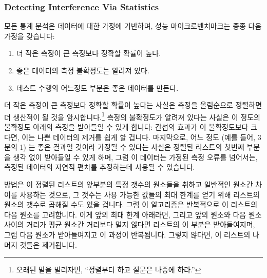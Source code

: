 \fi

\subsubsection{Detecting Interference Via Statistics}
\label{sec:debugging:Detecting Interference Via Statistics}

모든 통계 분석은 데이터에 대한 가정에 기반하며, 성능 마이크로벤치마크는 종종
다음 가정을 갖습니다:

\begin{enumerate}
\item	더 작은 측정이 큰 측정보다 정확할 확률이 높다.
\item	좋은 데이터의 측정 불확정도는 알려져 있다.
\item	테스트 수행의 어느정도 부분은 좋은 데이터를 만든다.

\end{enumerate}

더 작은 측정이 큰 측정보다 정확할 확률이 높다는 사실은 측정을 올림순으로
정렬하면 더 생산적이 될 것을 암시합니다.\footnote{
	오래된 말을 빌리자면, ``정렬부터 하고 질문은 나중에 하라.''}
측정의 불확정도가 알려져 있다는 사실은 이 정도의 불확정도 아래의 측정을
받아들일 수 있게 합니다:  간섭의 효과가 이 불확정도보다 크다면, 이는 나쁜
데이터의 제거를 쉽게 할 겁니다.
마지막으로, 어느 정도 (예를 들어, 3분의 1) 는 좋은 결과일 것이라 가정될 수
있다는 사실은 정렬된 리스트의 첫번째 부분을 생각 없이 받아들일 수 있게 하며,
그럼 이 데이터는 가정된 측정 오류를 넘어서는, 측정된 데이터의 자연적 편차를
추정하는데 사용될 수 있습니다.

방법은 이 정렬된 리스트의 앞부분의 특정 갯수의 원소들을 취하고 일반적인 원소간
차이를 사용하는 것으로, 그 갯수는 사용 가능한 값들의 최대 한계를 얻기 위해
리스트의 원소의 갯수로 곱해질 수도 있을 겁니다.
그럼 이 알고리즘은 반복적으로 이 리스트의 다음 원소를 고려합니다.
이게 앞의 최대 한계 아래라면, 그리고 앞의 원소와 다음 원소 사이의 거리가 평균
원소간 거리보다 멀지 않다면 리스트의 이 부분은 받아들여지며, 그럼 다음 원소가
받아들여지고 이 과정이 반복됩니다.
그렇지 않다면, 이 리스트의 나머지 것들은 제거됩니다.

